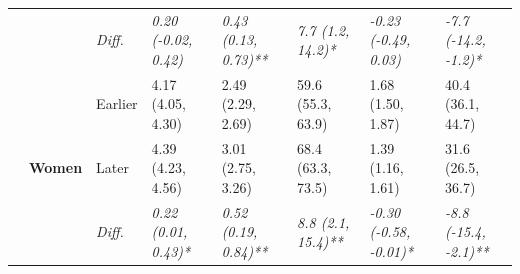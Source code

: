 \documentclass[12pt, a4paper]{article}
\begin{document}
\begin{appendices}
\begin{table}[!p]
{\begin{tabular}[t]{>{}l>{}lllllll}
        \cmidrule{3-8}
                                              &                                   & \cellcolor{gray!10}\em{Diff.} & \cellcolor{gray!10}\em{0.20 (-0.02, 0.42)}  & \cellcolor{gray!10}\em{0.43 (0.13, 0.73)**}  & \cellcolor{gray!10}\em{7.7 (1.2, 14.2)*}    & \cellcolor{gray!10}\em{-0.23 (-0.49, 0.03)}     & \cellcolor{gray!10}\em{-7.7 (-14.2, -1.2)*}    \\
        \cmidrule{2-8}
                                              & \multirow{3}{*}{\textbf{Women}}   & Earlier                       & 4.17 (4.05, 4.30)                           & 2.49 (2.29, 2.69)                            & 59.6 (55.3, 63.9)                           & 1.68 (1.50, 1.87)                               & 40.4 (36.1, 44.7)                              \\
        \cmidrule{3-8}
                                              &                                   & Later                         & 4.39 (4.23, 4.56)                           & 3.01 (2.75, 3.26)                            & 68.4 (63.3, 73.5)                           & 1.39 (1.16, 1.61)                               & 31.6 (26.5, 36.7)                              \\
        \cmidrule{3-8}
                                              &                                   & \cellcolor{gray!10}\em{Diff.} & \cellcolor{gray!10}\em{0.22 (0.01, 0.43)*}  & \cellcolor{gray!10}\em{0.52 (0.19, 0.84)**}  & \cellcolor{gray!10}\em{8.8 (2.1, 15.4)**}   & \cellcolor{gray!10}\em{-0.30 (-0.58, -0.01)*}   & \cellcolor{gray!10}\em{-8.8 (-15.4, -2.1)**}   \\
        \bottomrule
      \end{tabular}}
  \end{table}
  \vspace*{\fill}


\end{appendices}
\end{document}
